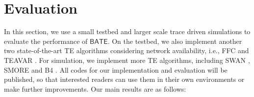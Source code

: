 \documentclass[sigconf]{acmart}
\begin{document}



%  
%

\section{Evaluation} \label{evaluation}
In this section, we use a small testbed and larger scale trace driven simulations  to evaluate the performance of $\mathsf{BATE}$. 
On the testbed, we also implement another two state-of-the-art TE algorithms considering network availability, i.e., FFC \cite{FFC} and TEAVAR \cite{Teavar}. 
For simulation, we implement more TE algorithms, including SWAN \cite{swan}, SMORE \cite{SMORE} and B4 \cite{B4}. 
All codes for our implementation and evaluation will be published, 
so that interested readers can use them in their own environments or make further improvements. 
Our main results are as follows:
\end{document}
